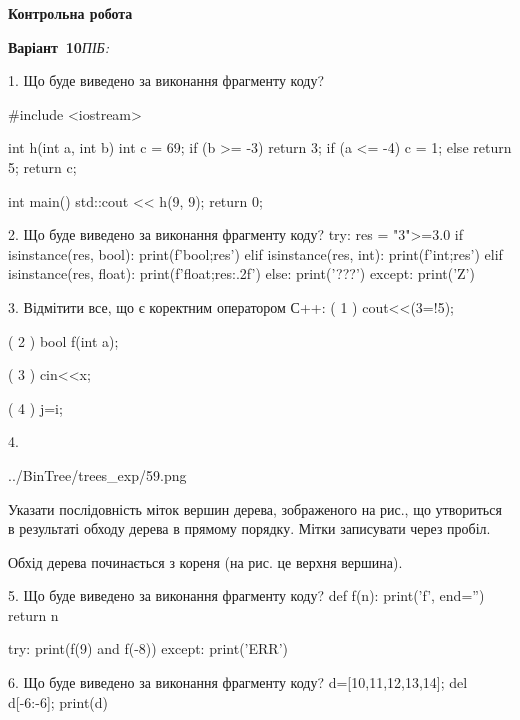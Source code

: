 \documentclass[11pt]{article}
\begin{document}
{\large\textbf{Контрольна робота}}

\textbf{Варіант \No\,10}\hfill \textit{ПІБ:}\,\underline{\hspace{60mm}}
\vspace{4mm}

1. Що буде виведено за виконання фрагменту коду?

#include <iostream>

int h(int a, int b){
    int c = 69;
    if (b >= -3)
        return 3;
    if (a <= -4)
         c = 1;
    else 
        return 5;
    return c;
}

int main(){
    std::cout << h(9, 9);
    return 0;
}
\vspace{5mm}

2. Що буде виведено за виконання фрагменту коду?
try:
    res = "3">=3.0
    if isinstance(res, bool):
        print(f'bool;{res}')
    elif isinstance(res, int):
        print(f'int;{res}')
    elif isinstance(res, float):
        print(f'float;{res:.2f}')
    else:
        print('???')
except:
    print('Z')
\vspace{5mm}

3. %
Відмітити все, що є коректним оператором С++:
( 1 ) cout<<(3=!5);

( 2 ) bool f(int a);

( 3 ) cin<<x;

( 4 ) j=i;
\vspace{5mm}

4. 

\begin{center}
	{../BinTree/trees_exp/59.png}
\end{center}
Указати послідовність міток вершин дерева, зображеного на рис., що утвориться в результаті обходу дерева в прямому порядку. Мітки записувати через пробіл.\par Обхід дерева починається з кореня (на рис. це верхня вершина).
\vspace{5mm}

5. Що буде виведено за виконання фрагменту коду?
def f(n):
    print('f', end='')
    return n

try:
    print(f(9) and f(-8))
except:
    print('ERR')
\vspace{5mm}

6. Що буде виведено за виконання фрагменту коду?
d=[10,11,12,13,14]; del d[-6:-6]; print(d)\vspace{5mm}
\end{document}
